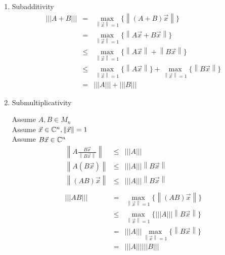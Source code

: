 \documentclass[letterpaper,12pt,fleqn]{article}
\newcommand{\norm}[1]{\left\lVert#1\right\rVert}
\newcommand{\mnorm}[1]{\left\lvert\left\lvert\left\lvert#1
  \right\rvert\right\rvert\right\rvert}
\newcommand{\vx}{\vec{x}}
\begin{document}
\begin{enumerate}
\item Subadditivity
  \begin{eqnarray*}
    \mnorm{A+B} &=& \max_{\norm{\vx}=1}\{\norm{(A+B)\vx}\} \\
    &=& \max_{\norm{\vx}=1}\{\norm{A\vx+B\vx}\} \\
    &\le& \max_{\norm{\vx}=1}\{\norm{A\vx}+\norm{B\vx}\} \\
    &\le& \max_{\norm{\vx}=1}\{\norm{A\vx}\}+\max_{\norm{\vx}=1}\{\norm{B\vx}\} \\
    &=& \mnorm{A}+\mnorm{B}
  \end{eqnarray*}

\item Submultiplicativity

  Assume $A,B\in M_n$ \\
  Assume $\vx\in\C^n,\norm{\vx}=1$ \\
  Assume $B\vx\in\C^n$ \\
  \begin{eqnarray*}
    \norm{A\frac{B\vx}{\norm{B\vx}}} &\le& \mnorm{A} \\
    \norm{A(B\vx)} &\le& \mnorm{A}\norm{B\vx} \\
    \norm{(AB)\vx} &\le& \mnorm{A}\norm{B\vx} \\
    \\
    \mnorm{AB} &=& \max_{\norm{\vx}=1}\{\norm{(AB)\vx}\} \\
    &\le& \max_{\norm{\vx}=1}\{\mnorm{A}\norm{B\vx}\} \\
    &=& \mnorm{A}\max_{\norm{\vx}=1}\{\norm{B\vx}\} \\
    &=& \mnorm{A}\mnorm{B}
  \end{eqnarray*}
\end{enumerate}
\end{document}
